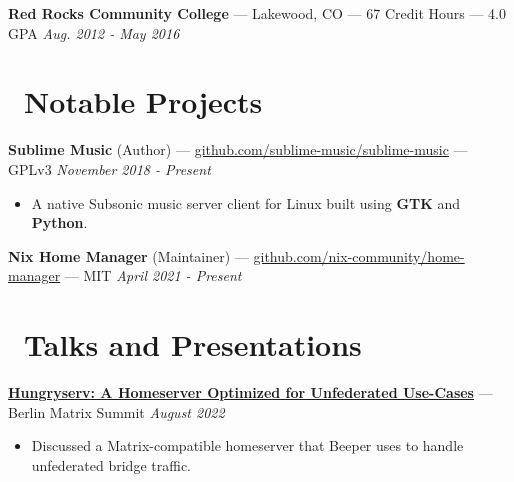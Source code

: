 \documentclass[10pt,letterpaper]{article}
\begin{document}
{\fontsize{11}{0}
\textbf{Red Rocks Community College} --- Lakewood, CO --- 67 Credit Hours --- 4.0 GPA}
\hfill \textit{Aug. 2012 - May 2016}

\section*{\faCode\ Notable Projects}
{\fontsize{11}{0}
\textbf{Sublime Music} (Author) ---
\href{https://github.com/sublime-music/sublime-music}{github.com/sublime-music/sublime-music} --- GPLv3}
\hfill \textit{November 2018 - Present}
\begin{itemize}
    \item A native Subsonic music server client for Linux built using
        \textbf{GTK} and \textbf{Python}.
\end{itemize}

{\fontsize{11}{0}
\textbf{Nix Home Manager} (Maintainer) ---
\href{https://github.com/nix-community/home-manager}{github.com/nix-community/home-manager} --- MIT}
\hfill \textit{April 2021 - Present}


\section*{\faUsers\ Talks and Presentations}
{\fontsize{11}{0}\href{https://github.com/sumnerevans/hungryserv-presentation}{%
\textbf{Hungryserv: A Homeserver Optimized for Unfederated Use-Cases}}
--- Berlin Matrix Summit}
\hfill \textit{August 2022}
\begin{itemize}
    \item Discussed a Matrix-compatible homeserver that Beeper uses to handle
        unfederated bridge traffic.
\end{itemize}
\end{document}
